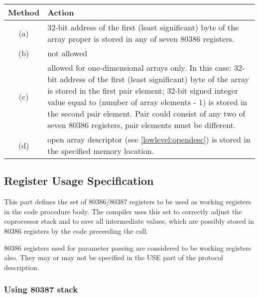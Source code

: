 \begin{tabular}{|c|p{8.5cm}|} \hline
Method & Action \\ \hline
(a) &
         32-bit address of the first (least significant) byte
         of the array proper is stored in any of seven 80386 registers. \\ \hline
(b) & not allowed                                                \\ \hline
(c) & allowed for one-dimensional arrays only.
    In this case:
      32-bit address of the first (least significant) byte
      of the array is stored in the first pair element;
      32-bit signed integer value equal to
      (number of array elements - 1) is stored in the second
      pair element.
      Pair could consist of any two of seven 80386 registers,
      pair elements must be different.                           \\ \hline
(d) &
         open array descriptor (see \ref{lowlevel:opendesc})
         is stored in the specified memory location.             \\ \hline
\end{tabular}

\subsection{Register Usage Specification}

   This part defines the set of 80386/80387 registers to be used as
 working registers in the code procedure body. The compiler uses this set
 to correctly adjust the coprocessor stack and to save all intermediate
 values, which are possibly stored in 80386 registers by the code preceeding
 the call.

   80386 registers used for parameter passing are considered to be working
 registers also. They may or may not be specified in the USE part of the
 protocol description.

\subsubsection{Using 80387 stack}\label{lowlevel:stack387}

